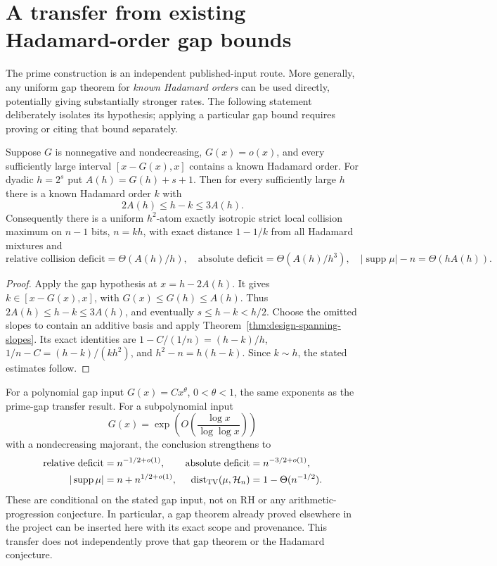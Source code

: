 \section{A transfer from existing Hadamard-order gap bounds}
\label{sec:stability-hadamard-gap-transfer}
The prime construction is an independent published-input route. More
generally, any uniform gap theorem for \emph{known Hadamard orders}
can be used directly, potentially giving substantially stronger rates.
The following statement deliberately isolates its hypothesis; applying a
particular gap bound requires proving or citing that bound separately.

\begin{theorem}
\label{thm:stability-hadamard-gap-transfer}
Suppose $G$ is nonnegative and nondecreasing, $G(x)=o(x)$, and every
sufficiently large interval $[x-G(x),x]$ contains a known Hadamard order.
For dyadic $h=2^s$ put $A(h)=G(h)+s+1$. Then for every sufficiently large
$h$ there is a known Hadamard order $k$ with
\[
 2A(h)\le h-k\le3A(h).
\]
Consequently there is a uniform $h^2$-atom exactly isotropic strict local
collision maximum on $n-1$ bits, $n=kh$, with exact distance $1-1/k$
from all Hadamard mixtures and
\[
 \text{relative collision deficit}=\Theta(A(h)/h),\quad
 \text{absolute deficit}=\Theta(A(h)/h^3),\quad
 |\operatorname{supp}\mu|-n=\Theta(hA(h)).
\]
\end{theorem}
\begin{proof}
Apply the gap hypothesis at $x=h-2A(h)$. It gives
$k\in[x-G(x),x]$, with $G(x)\le G(h)\le A(h)$.
Thus $2A(h)\le h-k\le3A(h)$, and eventually
$s\le h-k<h/2$. Choose the omitted slopes to contain an additive basis
and apply Theorem~\ref{thm:design-spanning-slopes}. Its exact identities
are $1-C/(1/n)=(h-k)/h$, $1/n-C=(h-k)/(kh^2)$, and
$h^2-n=h(h-k)$. Since $k\sim h$, the stated estimates follow.
\end{proof}

For a polynomial gap input $G(x)=Cx^\theta$, $0<\theta<1$, the same
exponents as the prime-gap transfer result. For a subpolynomial input
\[
 G(x)=\exp\!\left(O\!\left(\frac{\log x}{\log\log x}\right)\right)
\]
with a nondecreasing majorant, the conclusion strengthens to
\begin{align*}
 \text{relative deficit}&=n^{-1/2+o(1)},&
 \text{absolute deficit}&=n^{-3/2+o(1)},\\
 |\operatorname{supp}\mu|&=n+n^{1/2+o(1)},&
 \operatorname{dist}_{\rm TV}(\mu,\mathcal H_n)&=1-\Theta(n^{-1/2}).
\end{align*}
These are conditional on the stated gap input, not on RH or any
arithmetic-progression conjecture. In particular, a gap theorem already
proved elsewhere in the project can be inserted here with its exact
scope and provenance. This transfer does not independently prove that
gap theorem or the Hadamard conjecture.
